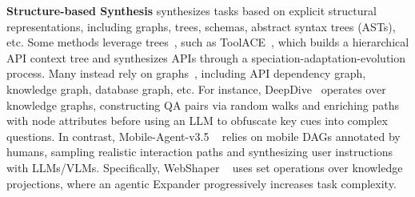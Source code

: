 \documentclass{llmxive}
\begin{document}




\textbf{Structure-based Synthesis} synthesizes tasks based on explicit structural representations, including graphs, trees, schemas, abstract syntax trees (ASTs), etc. Some methods leverage trees~\cite{ToolACE,WebLeaper}, such as ToolACE~\cite{ToolACE}, which builds a hierarchical API context tree and synthesizes APIs through a speciation-adaptation-evolution process. Many instead rely on graphs~\cite{WebSailor,DeepDive,AgentScaler,Tongyi_DeepResearch,CRMWeaver,ToolACE-MCP,MagicAgent,OpenSeeker}, including API dependency graph, knowledge graph, database graph, etc. For instance, DeepDive~\cite{DeepDive} operates over knowledge graphs, constructing QA pairs via random walks and enriching paths with node attributes before using an LLM to obfuscate key cues into complex questions. In contrast, Mobile-Agent-v3.5 ~\cite{Mobile-Agent-v3.5} relies on mobile DAGs annotated by humans, sampling realistic interaction paths and synthesizing user instructions with LLMs/VLMs. Specifically, WebShaper ~\cite{WebShaper} uses set operations over knowledge projections, where an agentic Expander progressively increases task complexity.
\end{document}
